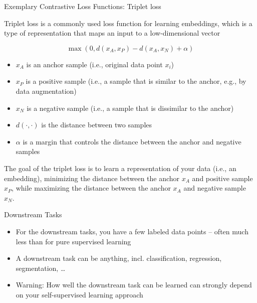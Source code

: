\documentclass[aspectratio=169]{../latex_main/tntbeamer}  %
\begin{document}
    
    \begin{frame}[c]{Exemplary Contrastive Loss Functions: Triplet loss}

        \alert{Triplet loss} is a commonly used loss function for learning embeddings, which is a type of representation that maps an input to a low-dimensional vector

            $$\max(0, d(x_A,x_P) - d(x_A,x_N) + \alpha)$$

            \begin{itemize}
                \item $x_A$ is an anchor sample (i.e., original data point $x_i$)
                \item $x_P$ is a positive sample (i.e., a sample that is similar to the anchor, e.g., by data augmentation)
                \item $x_N$ is a negative sample (i.e., a sample that is dissimilar to the anchor)
                \item $d(\cdot,\cdot)$ is the distance between two samples
                \item $\alpha$ is a margin that controls the distance between the anchor and negative samples
            \end{itemize}

         The goal of the triplet loss is to learn a representation of your data (i.e., an embedding), minimizing the distance between the anchor $x_A$ and positive sample $x_P$, while maximizing the distance between the anchor $x_A$  and negative sample $x_N$.
                
        
    \end{frame}

    \begin{frame}[c]{Downstream Tasks}

        \begin{itemize}
            \item For the downstream tasks, you have a few labeled data points -- often much less than for pure supervised learning
            \item A downstream task can be anything, incl. classification, regression, segmentation, \ldots
            \item \alert{Warning:} How well the downstream task can be learned can strongly depend on your self-supervised learning approach
        \end{itemize}
        
    \end{frame}
\end{document}

